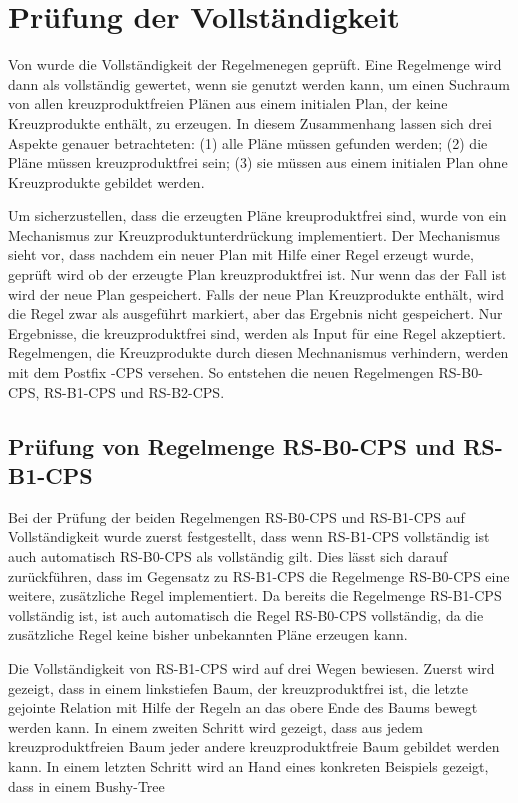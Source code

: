 \section{Prüfung der Vollständigkeit}

Von \cite{shanbhag2014optimizing} wurde die Vollständigkeit der Regelmenegen geprüft. Eine Regelmenge wird dann als vollständig gewertet, wenn sie genutzt werden kann, um einen Suchraum von allen kreuzproduktfreien Plänen aus einem initialen Plan, der keine Kreuzprodukte enthält, zu erzeugen. In diesem Zusammenhang lassen sich drei Aspekte genauer betrachteten: (1) alle Pläne müssen gefunden werden; (2) die Pläne müssen kreuzproduktfrei sein; (3) sie müssen aus einem initialen Plan ohne Kreuzprodukte gebildet werden.

Um sicherzustellen, dass die erzeugten Pläne kreuproduktfrei sind, wurde von \cite{shanbhag2014optimizing} ein Mechanismus zur Kreuzproduktunterdrückung implementiert. Der Mechanismus sieht vor, dass nachdem ein neuer Plan mit Hilfe einer Regel erzeugt wurde, geprüft wird ob der erzeugte Plan kreuzproduktfrei ist. Nur wenn das der Fall ist wird der neue Plan gespeichert. Falls der neue Plan Kreuzprodukte enthält, wird die Regel zwar als ausgeführt markiert, aber das Ergebnis nicht gespeichert. Nur Ergebnisse, die kreuzproduktfrei sind, werden als Input für eine Regel akzeptiert. Regelmengen, die Kreuzprodukte durch diesen Mechnanismus verhindern,  werden mit dem Postfix -CPS versehen. So entstehen die neuen Regelmengen RS-B0-CPS, RS-B1-CPS und RS-B2-CPS.


\subsection{Prüfung von Regelmenge RS-B0-CPS und RS-B1-CPS}

Bei der Prüfung der beiden Regelmengen RS-B0-CPS und RS-B1-CPS auf Vollständigkeit wurde zuerst festgestellt, dass wenn RS-B1-CPS vollständig ist auch automatisch RS-B0-CPS als vollständig gilt. Dies lässt sich darauf zurückführen, dass im Gegensatz zu RS-B1-CPS die Regelmenge RS-B0-CPS eine weitere, zusätzliche Regel implementiert. Da bereits die Regelmenge RS-B1-CPS vollständig ist, ist auch automatisch die Regel RS-B0-CPS vollständig, da die zusätzliche Regel keine bisher unbekannten Pläne erzeugen kann.


Die Vollständigkeit von RS-B1-CPS wird auf drei Wegen bewiesen. Zuerst wird gezeigt, dass in einem linkstiefen Baum, der kreuzproduktfrei ist, die letzte gejointe Relation mit Hilfe der Regeln an das obere Ende des Baums bewegt werden kann. In einem zweiten Schritt wird gezeigt, dass aus jedem kreuzproduktfreien Baum jeder andere kreuzproduktfreie Baum gebildet werden kann. In einem letzten Schritt wird an Hand eines konkreten Beispiels gezeigt, dass in einem Bushy-Tree 









